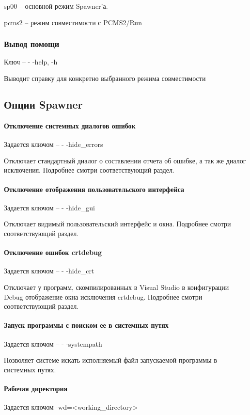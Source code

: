 \documentclass{imcs}
\begin{document}
sp00 -- основной режим Spawner'а.

pcms2 -- режим совместимости с PCMS2/Run
\subsubsection{Вывод помощи}

Ключ -- - -help, -h

Выводит справку для конкретно выбранного режима совместимости

\subsection{Опции Spawner}
\paragraph{Отключение системных диалогов ошибок}
Задается ключом -- - -hide\_errors

Отключает стандартный диалог о составлении отчета об ошибке, а так же диалог исключения. Подробнее смотри соответствующий раздел.

\paragraph{Отключение отображения пользовательского интерфейса}
Задается ключом -- - -hide\_gui

Отключает видимый пользовательский интерфейс и окна. Подробнее смотри соответствующий раздел.

\paragraph{Отключение ошибок crtdebug}
Задается ключом -- - -hide\_crt

Отключает у программ, скомпилированных в Visual Studio в конфигурации Debug отображение окна исключения crtdebug. Подробнее смотри соответствующий раздел.

\paragraph{Запуск программы с поиском ее в системных путях}
Задается ключом -- - -systempath

Позволяет системе искать исполняемый файл запускаемой программы в системных путях.

\paragraph{Рабочая директория}
Задается ключом -wd=<working\_directory>
\end{document}

